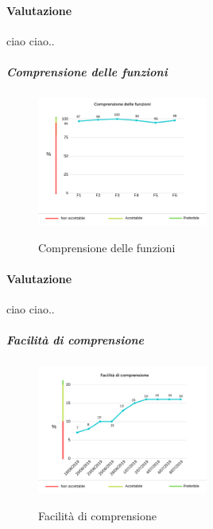 	\paragraph*{Valutazione} ciao ciao..
	\pagebreak
	\subparagraph{Comprensione delle funzioni}
	\begin{center}
		\begin{figure}[h] 
			\centering 
			\includegraphics[width=0.5\textwidth]{res/images/new/comprensioneFunzioni.png}\\
			\caption{Comprensione delle funzioni}
		\end{figure}
	\end{center}
	\paragraph*{Valutazione} ciao ciao..
	\pagebreak
	\subparagraph{Facilità di comprensione}
	\begin{center}
		\begin{figure}[h] 
			\centering 
			\includegraphics[width=0.5\textwidth]{res/images/new/facilitaComprensione.png}\\
			\caption{Facilità di comprensione}
		\end{figure}
	\end{center}
